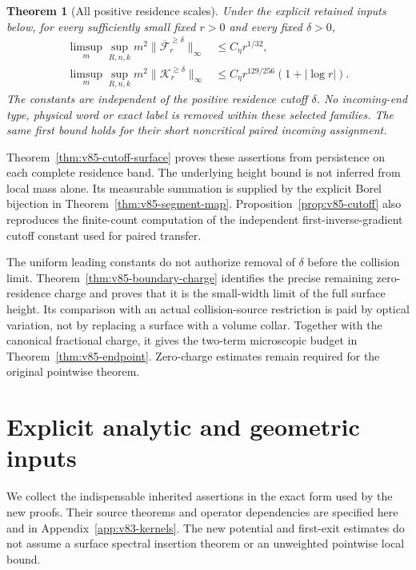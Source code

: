 \documentclass[11pt,reqno]{amsart}
\numberwithin{equation}{section}
\newtheorem{theorem}{Theorem}[section]
\theoremstyle{definition}
\theoremstyle{remark}\newtheorem{remark}[theorem]{Remark}
\begin{document}
\begin{theorem}[All positive residence scales]
\label{thm:v85-main}
Under the explicit retained inputs below, for every sufficiently small
fixed $r>0$ and every fixed $\delta>0$,
\begin{align}
 \limsup_m\sup_{R,n,k}m^2
       \|\overline{\mathcal F}_r^{\ge\delta}\|_\infty
                 &\le C_\eta r^{1/32},\label{eq:v85-main-surface}\\
 \limsup_m\sup_{R,n,k}m^2\|\mathcal K_r^{\ge\delta}\|_\infty
                 &\le C_\eta r^{129/256}(1+|\log r|).
                                               \label{eq:v85-main-critical}
\end{align}
The constants are independent of the positive residence cutoff
$\delta$. No incoming-end type, physical word or exact label is removed
within these selected families. The same first bound holds for their
short noncritical paired incoming assignment.
\end{theorem}
Theorem~\ref{thm:v85-cutoff-surface} proves these assertions from
persistence on each complete residence band. The underlying height
bound is not inferred from local mass alone. Its measurable summation
is supplied by the explicit Borel bijection in
Theorem~\ref{thm:v85-segment-map}. Proposition~\ref{prop:v85-cutoff}
also reproduces the finite-count computation of the independent
first-inverse-gradient cutoff constant used for paired transfer.

The uniform leading constants do not authorize removal of $\delta$
before the collision limit. Theorem~\ref{thm:v85-boundary-charge}
identifies the precise remaining zero-residence charge and proves that
it is the small-width limit of the full surface height. Its comparison
with an actual collision-source restriction is paid by optical
variation, not by replacing a surface with a volume collar. Together
with the canonical fractional charge, it gives the two-term
microscopic budget in Theorem~\ref{thm:v85-endpoint}. Zero-charge
estimates remain required for the original pointwise theorem.

\section{Explicit analytic and geometric inputs}
We collect the indispensable inherited assertions in the exact form
used by the new proofs. Their source theorems and operator dependencies
are specified here and in Appendix~\ref{app:v83-kernels}. The new
potential and first-exit estimates do not assume a surface spectral
insertion theorem or an unweighted pointwise local bound.
\end{document}
